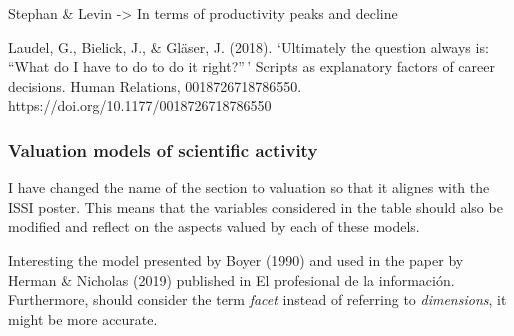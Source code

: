 \documentclass[]{elsarticle} %
\begin{document}
Stephan \& Levin -\textgreater{} In terms of productivity peaks and
decline

Laudel, G., Bielick, J., \& Gläser, J. (2018). `Ultimately the question
always is: ``What do I have to do to do it right?''\,' Scripts as
explanatory factors of career decisions. Human Relations,
0018726718786550. https://doi.org/10.1177/0018726718786550

\hypertarget{valuation-models-of-scientific-activity}{%
\subsubsection{Valuation models of scientific
activity}\label{valuation-models-of-scientific-activity}}

I have changed the name of the section to valuation so that it alignes
with the ISSI poster. This means that the variables considered in the
table should also be modified and reflect on the aspects valued by each
of these models.

Interesting the model presented by Boyer (1990) and used in the paper by
Herman \& Nicholas (2019) published in El profesional de la información.
Furthermore, should consider the term \emph{facet} instead of referring
to \emph{dimensions}, it might be more accurate.
\end{document}
